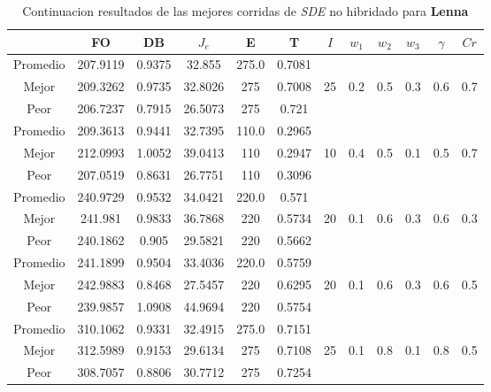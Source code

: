 \begin{table}[h!]
    \footnotesize
    \begin{center}
        \begin{tabular}{|c|c|c|c|c|c|c|c|c|c|c|c|}
        \hline
            & {\bf FO} & {\bf DB} & $J_e$ & {\bf E} & {\bf T} & $I$ & $w_1$ & $w_2$ & $w_3$ & $\gamma$ & $Cr$ \\
        \hline
        \hline
            Promedio  & 207.9119 & 0.9375 & 32.855 & 275.0 & 0.7081 &  &  &  &  &  & \\
            \cline{1-6}
            Mejor & 209.3262 & 0.9735  & 32.8026 & 275 & 0.7008 & 25 & 0.2 & 0.5 & 0.3 & 0.6 & 0.7\\
            \cline{1-6}
            Peor & 206.7237 & 0.7915  & 26.5073 & 275 & 0.721 &  &  &  &  &  & \\
        \hline
        \hline
            Promedio  & 209.3613 & 0.9441 & 32.7395 & 110.0 & 0.2965 &  &  &  &  &  & \\
            \cline{1-6}
            Mejor & 212.0993 & 1.0052  & 39.0413 & 110 & 0.2947 & 10 & 0.4 & 0.5 & 0.1 & 0.5 & 0.7\\
            \cline{1-6}
            Peor & 207.0519 & 0.8631  & 26.7751 & 110 & 0.3096 &  &  &  &  &  & \\
        \hline
        \hline
            Promedio  & 240.9729 & 0.9532 & 34.0421 & 220.0 & 0.571 &  &  &  &  &  & \\
            \cline{1-6}
            Mejor & 241.981 & 0.9833  & 36.7868 & 220 & 0.5734 & 20 & 0.1 & 0.6 & 0.3 & 0.6 & 0.3\\
            \cline{1-6}
            Peor & 240.1862 & 0.905  & 29.5821 & 220 & 0.5662 &  &  &  &  &  & \\
        \hline
        \hline
            Promedio  & 241.1899 & 0.9504 & 33.4036 & 220.0 & 0.5759 &  &  &  &  &  & \\
            \cline{1-6}
            Mejor & 242.9883 & 0.8468  & 27.5457 & 220 & 0.6295 & 20 & 0.1 & 0.6 & 0.3 & 0.6 & 0.5\\
            \cline{1-6}
            Peor & 239.9857 & 1.0908  & 44.9694 & 220 & 0.5754 &  &  &  &  &  & \\
        \hline
        \hline
            Promedio  & 310.1062 & 0.9331 & 32.4915 & 275.0 & 0.7151 &  &  &  &  &  & \\
            \cline{1-6}
            Mejor & 312.5989 & 0.9153  & 29.6134 & 275 & 0.7108 & 25 & 0.1 & 0.8 & 0.1 & 0.8 & 0.5\\
            \cline{1-6}
            Peor & 308.7057 & 0.8806  & 30.7712 & 275 & 0.7254 &  &  &  &  &  & \\
        \hline
        \end{tabular}
        \caption{Continuacion resultados de las mejores corridas de \emph{SDE} no hibridado para {\bf Lenna}}
        \label{tb:tablesdealgimgc}
    \end{center}
\end{table}
